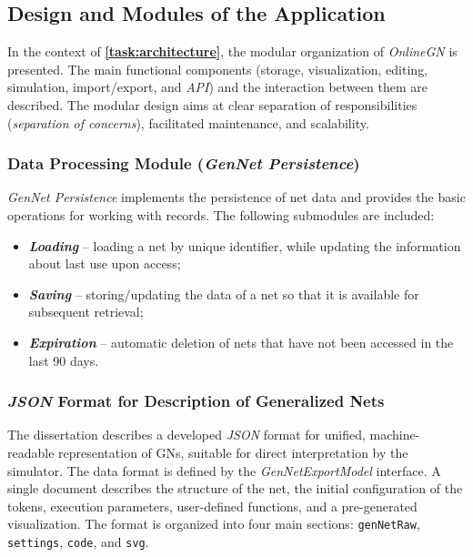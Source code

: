 	\subsection{Design and Modules of the Application}
	\hspace*{2.5em}In the context of \textbf{\ref{task:architecture}}, the modular organization of \textit{OnlineGN} is presented. The main functional components (storage, visualization, editing, simulation, import/export, and \textit{API}) and the interaction between them are described. The modular design aims at clear separation of responsibilities (\textit{separation of concerns}), facilitated maintenance, and scalability.
	
	\subsubsection{Data Processing Module (\textit{GenNet Persistence})}
	\hspace*{2.5em}\textit{GenNet Persistence} implements the persistence of net data and provides the basic operations for working with records. The following submodules are included:
	\begin{itemize}
		\item \textbf{\textit{Loading}} -- loading a net by unique identifier, while updating the information about last use upon access;
		\item \textbf{\textit{Saving}} -- storing/updating the data of a net so that it is available for subsequent retrieval;
		\item \textbf{\textit{Expiration}} -- automatic deletion of nets that have not been accessed in the last 90 days.
	\end{itemize}
	
	\subsubsection{\textit{JSON} Format for Description of Generalized Nets}
	\label{subsec:gn-json-format}
	
	\hspace*{2.5em}The dissertation describes a developed \textit{JSON} format for unified, machine-readable representation of GNs, suitable for direct interpretation by the simulator. The data format is defined by the \textit{GenNetExportModel} interface. A single document describes the structure of the net, the initial configuration of the tokens, execution parameters, user-defined functions, and a pre-generated visualization. The format is organized into four main sections: \texttt{genNetRaw}, \texttt{settings}, \texttt{code}, and \texttt{svg}.
	
